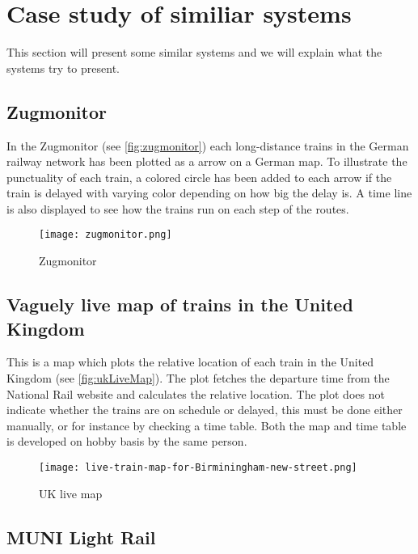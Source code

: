 \clearpage
\section{Case study of similiar systems}
\label{sect:backgroundExamples}
This section will present some similar systems and we will explain what the
systems try to present.
\subsection{Zugmonitor}
\label{sub:subsection_zugmonitor}

In the Zugmonitor (see \vref{fig:zugmonitor}) each long-distance 
trains in the German railway network has been plotted as a arrow on a German 
map. To illustrate the punctuality of each train, a colored circle has been 
added to each arrow if the train is delayed with varying color depending on 
how big the delay is. A time line is also displayed to see how the trains run 
on each step of the routes. 

\begin{figure}[!htbp]
	\texttt{[image: zugmonitor.png]}
	\caption[Zugmonitor]{Zugmonitor \cite{zugmonitor}}
	\label{fig:zugmonitor}
\end{figure}
\pagebreak

\clearpage
\subsection{Vaguely live map of trains in the United Kingdom}
\label{sub:subsection_ukLiveMap}

This is a map which plots the relative location of each train in the United
Kingdom (see \vref{fig:ukLiveMap}). The plot fetches the departure time from the 
National Rail website and calculates the relative location. The plot does not
indicate whether the trains are on schedule or delayed, this must be
done either manually, or for instance by checking a time table\cite{trainTimesUK}.
Both the map and time table is developed on hobby basis by the same person. 

\begin{figure}[!htbp]
	\texttt{[image: live-train-map-for-Birminingham-new-street.png]}
	\caption[UK live map]{UK live map \cite{ukLiveMap}}
	\label{fig:ukLiveMap}
\end{figure}
\pagebreak

\clearpage
\subsection{MUNI Light Rail}
\label{sub:subsection_muniLightRail}

